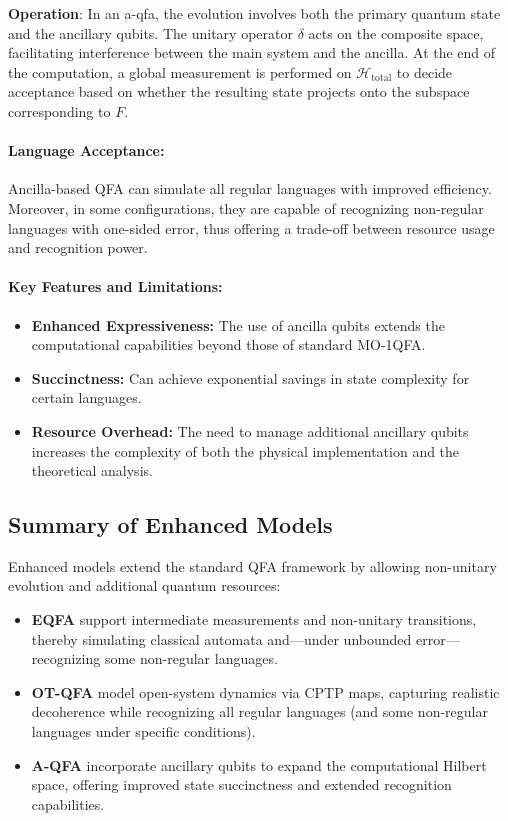 \textbf{Operation}:  
In an \gls{a-qfa}, the evolution involves both the primary quantum state and the ancillary qubits. The unitary operator \(\delta\) acts on the composite space, facilitating interference between the main system and the ancilla. At the end of the computation, a global measurement is performed on \(\mathcal{H}_{\text{total}}\) to decide acceptance based on whether the resulting state projects onto the subspace corresponding to \( F \).

\paragraph{Language Acceptance:}  
Ancilla-based QFA can simulate all regular languages with improved efficiency. Moreover, in some configurations, they are capable of recognizing non-regular languages with one-sided error, thus offering a trade-off between resource usage and recognition power.

\paragraph{Key Features and Limitations:}
\begin{itemize}
    \item \textbf{Enhanced Expressiveness:} The use of ancilla qubits extends the computational capabilities beyond those of standard MO-1QFA.
    \item \textbf{Succinctness:} Can achieve exponential savings in state complexity for certain languages.
    \item \textbf{Resource Overhead:} The need to manage additional ancillary qubits increases the complexity of both the physical implementation and the theoretical analysis.
\end{itemize}

\subsection*{Summary of Enhanced Models}
Enhanced models extend the standard QFA framework by allowing non-unitary evolution and additional quantum resources:
\begin{itemize}
    \item \textbf{EQFA} support intermediate measurements and non-unitary transitions, thereby simulating classical automata and—under unbounded error—recognizing some non-regular languages.
    \item \textbf{OT-QFA} model open-system dynamics via CPTP maps, capturing realistic decoherence while recognizing all regular languages (and some non-regular languages under specific conditions).
    \item \textbf{A-QFA} incorporate ancillary qubits to expand the computational Hilbert space, offering improved state succinctness and extended recognition capabilities.
\end{itemize}

